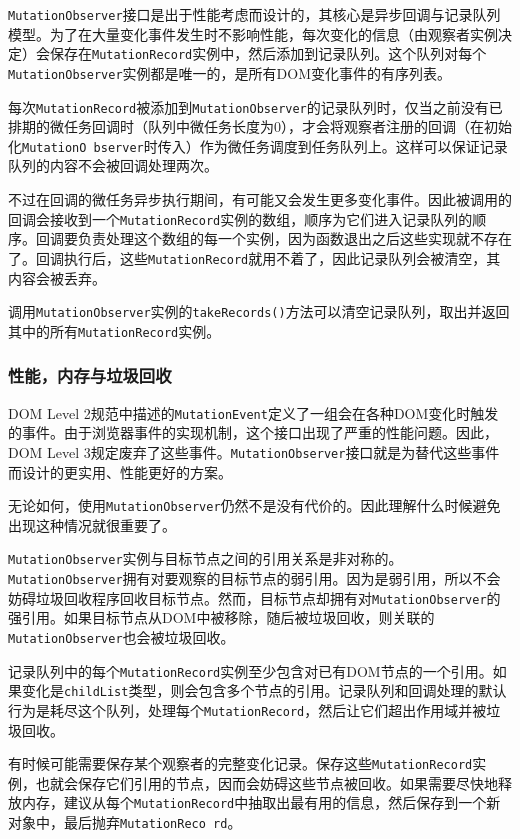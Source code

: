 \texttt{MutationObserver}接口是出于性能考虑而设计的，其核心是异步回调与记录队列模型。为了在大量变化事件发生时不影响性能，每次变化的信息（由观察者实例决定）会保存在\texttt{MutationRecord}实例中，然后添加到记录队列。这个队列对每个\texttt{MutationObserver}实例都是唯一的，是所有DOM变化事件的有序列表。

每次\texttt{MutationRecord}被添加到\texttt{MutationObserver}的记录队列时，仅当之前没有已排期的微任务回调时（队列中微任务长度为0），才会将观察者注册的回调（在初始化\texttt{MutationO bserver}时传入）作为微任务调度到任务队列上。这样可以保证记录队列的内容不会被回调处理两次。

不过在回调的微任务异步执行期间，有可能又会发生更多变化事件。因此被调用的回调会接收到一个\texttt{MutationRecord}实例的数组，顺序为它们进入记录队列的顺序。回调要负责处理这个数组的每一个实例，因为函数退出之后这些实现就不存在了。回调执行后，这些\texttt{MutationRecord}就用不着了，因此记录队列会被清空，其内容会被丢弃。

调用\texttt{MutationObserver}实例的\texttt{takeRecords()}方法可以清空记录队列，取出并返回其中的所有\texttt{MutationRecord}实例。

\subsubsection*{性能，内存与垃圾回收}

DOM  Level  2规范中描述的\texttt{MutationEvent}定义了一组会在各种DOM变化时触发的事件。由于浏览器事件的实现机制，这个接口出现了严重的性能问题。因此，DOM Level 3规定废弃了这些事件。\texttt{MutationObserver}接口就是为替代这些事件而设计的更实用、性能更好的方案。

无论如何，使用\texttt{MutationObserver}仍然不是没有代价的。因此理解什么时候避免出现这种情况就很重要了。

\texttt{MutationObserver}实例与目标节点之间的引用关系是非对称的。\texttt{MutationObserver}拥有对要观察的目标节点的弱引用。因为是弱引用，所以不会妨碍垃圾回收程序回收目标节点。然而，目标节点却拥有对\texttt{MutationObserver}的强引用。如果目标节点从DOM中被移除，随后被垃圾回收，则关联的\texttt{MutationObserver}也会被垃圾回收。

记录队列中的每个\texttt{MutationRecord}实例至少包含对已有DOM节点的一个引用。如果变化是\texttt{childList}类型，则会包含多个节点的引用。记录队列和回调处理的默认行为是耗尽这个队列，处理每个\texttt{MutationRecord}，然后让它们超出作用域并被垃圾回收。

有时候可能需要保存某个观察者的完整变化记录。保存这些\texttt{MutationRecord}实例，也就会保存它们引用的节点，因而会妨碍这些节点被回收。如果需要尽快地释放内存，建议从每个\texttt{MutationRecord}中抽取出最有用的信息，然后保存到一个新对象中，最后抛弃\texttt{MutationReco rd}。

\newpage